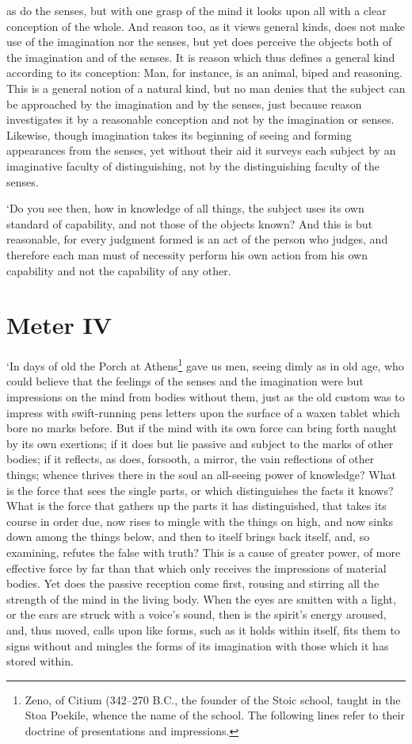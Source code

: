 as do the senses, but with one grasp of the mind it looks upon all
with a clear conception of the whole. And reason too, as it views
general kinds, does not make use of the imagination nor the senses,
but yet does perceive the objects both of the imagination and of the
senses. It is reason which thus defines a general kind according to
its conception: Man, for instance, is an animal, biped and reasoning.
This is a general notion of a natural kind, but no man denies that the
subject can be approached by the imagination and by the senses, just
because reason investigates it by a reasonable conception and not by
the imagination or senses. Likewise, though imagination takes its
beginning of seeing and forming appearances from the senses, yet
without their aid it surveys each subject by an imaginative faculty of
distinguishing, not by the distinguishing faculty of the senses.

`Do you see then, how in knowledge of all things, the subject uses its
own standard of capability, and not those of the objects known? And
this is but reasonable, for every judgment formed is an act of the
person who judges, and therefore each man must of necessity perform
 his own action from his own capability and not the
capability of any other.

\section*{Meter IV}

`In days of old the Porch at Athens\footnote{Zeno, of Citium (342--270
\textsc{B.C.}, the founder of the Stoic school, taught in the Stoa
Poekile, whence the name of the school. The following lines refer to
their doctrine of presentations and impressions.} gave us men, seeing
dimly as in old age, who could believe that the feelings of the senses
and the imagination were but impressions on the mind from bodies
without them, just as the old custom was to impress with swift-running
pens letters upon the surface of a waxen tablet which bore no marks
before. But if the mind with its own force can bring forth naught by
its own exertions; if it does but lie passive and subject to the marks
of other bodies; if it reflects, as does, forsooth, a mirror, the vain
reflections of other things; whence thrives there in the soul an
all-seeing power of knowledge? What is the force that sees the single
parts, or which distinguishes the facts it knows? What is the force
that gathers up the parts it has distinguished, that takes its course
in order due, now rises to mingle with the things on high, and now
sinks down among the things below, and then to itself brings back
itself, and, so examining, refutes the false with truth? This is a
cause of greater power, of more effective force by far than that which
only receives the impressions of material bodies. Yet does the passive
reception come first, rousing and stirring  all the strength
of the mind in the living body. When the eyes are smitten with a
light, or the ears are struck with a voice's sound, then is the
spirit's energy aroused, and, thus moved, calls upon like forms, such
as it holds within itself, fits them to signs without and mingles the
forms of its imagination with those which it has stored within.

